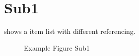\section[Sub1]{Sub1}\label{main1:sub:sub1}

 shows a item list with different referencing.

\begin{figure}[!h]
	\caption[{Main1; Sub; Sub1}]{Example Figure Sub1}
	\label{fig:main1:sub:sub1}
\end{figure}

